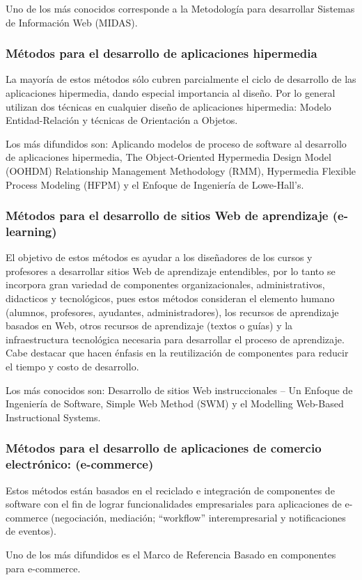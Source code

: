 Uno de los más conocidos corresponde a la Metodología para desarrollar Sistemas de Información Web (MIDAS).

\subsubsection{Métodos para el desarrollo de aplicaciones hipermedia}
La mayoría de estos métodos sólo cubren parcialmente el ciclo de desarrollo de las aplicaciones hipermedia, dando
especial importancia al diseño. Por lo general utilizan dos técnicas en cualquier diseño de aplicaciones hipermedia:
Modelo Entidad-Relación y técnicas de Orientación a Objetos. 

Los más difundidos son: Aplicando modelos de proceso
de software al desarrollo de aplicaciones hipermedia, The Object-Oriented Hypermedia Design Model (OOHDM)
Relationship Management Methodology (RMM), Hypermedia Flexible Process Modeling (HFPM) y el Enfoque de Ingeniería 
de Lowe-Hall’s.

\subsubsection{Métodos para el desarrollo de sitios Web de aprendizaje (e-learning)}
El objetivo de estos métodos es ayudar a los diseñadores de los cursos y profesores a desarrollar sitios Web de aprendizaje
entendibles, por lo tanto se incorpora gran variedad de componentes organizacionales, administrativos, didacticos y 
tecnológicos, pues estos métodos consideran el elemento humano (alumnos, profesores, ayudantes, administradores), 
los recursos de aprendizaje basados en Web, otros recursos de aprendizaje (textos o guías) y la infraestructura tecnológica 
necesaria para desarrollar el proceso de aprendizaje. Cabe destacar que hacen énfasis en la reutilización de componentes 
para reducir el tiempo y costo de desarrollo. 

Los más conocidos son: Desarrollo de sitios Web instruccionales – Un Enfoque de Ingeniería de Software, Simple Web Method (SWM) 
y el Modelling Web-Based Instructional Systems.


\subsubsection{Métodos para el desarrollo de aplicaciones de comercio electrónico: (e-commerce)}
Estos métodos están basados en el reciclado e integración de componentes de software con el fin de lograr funcionalidades 
empresariales para aplicaciones de e-commerce (negociación, mediación; “workflow” interempresarial y notificaciones de
eventos). 

Uno de los más difundidos es el Marco de Referencia Basado en componentes para e-commerce.


\newpage
